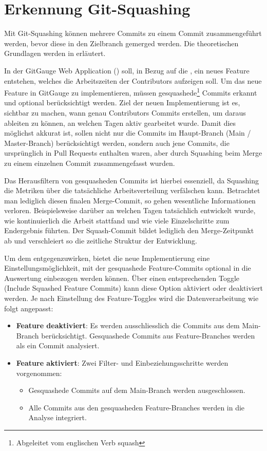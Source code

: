 \section{Erkennung Git-Squashing}
\label{sec:ErkennungSquashing}
Mit Git-Squashing können mehrere Commits zu einem Commit zusammengeführt werden, bevor diese in den Zielbranch gemerged werden. Die theoretischen Grundlagen werden in  erläutert. 

In der GitGauge Web Application () soll, in Bezug auf die , ein neues Feature entstehen, welches die Arbeitszeiten der Contributors aufzeigen soll. Um das neue Feature in GitGauge zu implementieren, müssen gesquashede\footnote{Abgeleitet vom englischen Verb squash} Commits erkannt und optional berücksichtigt werden. Ziel der neuen Implementierung ist es, sichtbar zu machen, wann genau Contributors Commits erstellen, um daraus ableiten zu können, an welchen Tagen aktiv gearbeitet wurde. Damit dies möglichst akkurat ist, sollen nicht nur die Commits im Haupt-Branch (Main / Master-Branch) berücksichtigt werden, sondern auch jene Commits, die ursprünglich in Pull Requests enthalten waren, aber durch Squashing beim Merge zu einem einzelnen Commit zusammengefasst wurden.

Das Herausfiltern von gesquasheden Commits ist hierbei essenziell, da Squashing die Metriken über die tatsächliche Arbeitsverteilung verfälschen kann. Betrachtet man lediglich diesen finalen Merge-Commit, so gehen wesentliche Informationen verloren. Beispielsweise darüber an welchen Tagen tatsächlich entwickelt wurde, wie kontinuierlich die Arbeit stattfand und wie viele Einzelschritte zum Endergebnis führten. Der Squash-Commit bildet lediglich den Merge-Zeitpunkt ab und verschleiert so die zeitliche Struktur der Entwicklung. 

Um dem entgegenzuwirken, bietet die neue Implementierung eine Einstellungsmöglichkeit, mit der gesquashede Feature-Commits optional in die Auswertung einbezogen werden können. Über einen entsprechenden Toggle (Include Squashed Feature Commits) kann diese Option aktiviert oder deaktiviert werden. Je nach Einstellung des Feature-Toggles wird die Datenverarbeitung wie folgt angepasst:
\begin{itemize}
    \item \textbf{Feature deaktiviert}: Es werden ausschliesslich die Commits aus dem Main-Branch berücksichtigt. Gesquashede Commits aus Feature-Branches werden als ein Commit analysiert.
    \item \textbf{Feature aktiviert}: Zwei Filter- und Einbeziehungsschritte werden vorgenommen:
        \begin{itemize}
        \item Gesquashede Commits auf dem Main-Branch werden ausgeschlossen.
        \item Alle Commits aus den gesquasheden Feature-Branches werden in die \linebreak Analyse integriert.
    \end{itemize}
\end{itemize}

